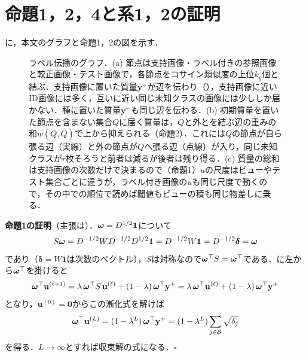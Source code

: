 \newcommand\TFaces{命題A1}
\newcommand\TLimits{定理A1}
\newcommand\TValid{定理A2}
\newcommand\TEscape{定理A3}
\newcommand\TCapture{定理A4}
\newcommand\CSep{系A1}
\section{命題1，2，4と系1，2の証明}
\label{sec:app_proofs}
に，本文のグラフと命題1，2の図を示す．

\begin{figure}[htbp]
\centering
\scalebox{0.77}{}
\caption{ラベル伝播のグラフ．(a) 節点は支持画像・ラベル付きの参照画像と較正画像・テスト画像で，各節点をコサイン類似度の上位$k_g$個と結ぶ．支持画像に置いた質量$\mathbf{y}^{+}$が辺を伝わり（），支持画像に近いID画像には多く，互いに近い同じ未知クラスの画像には少ししか届かない．種に置いた質量$\mathbf{y}^{-}$も同じ辺を伝わる．(b) 初期質量を置いた節点を含まない集合$Q$に届く質量は，$Q$と外とを結ぶ辺の重みの和$w(Q,\bar{Q})$で上から抑えられる（命題2）．これには$Q$の節点が自ら張る辺（実線）と外の節点が$Q$へ張る辺（点線）が入り，同じ未知クラスが$r$枚そろうと前者は減るが後者は残り得る．(c) 質量の総和は支持画像の次数だけで決まるので（命題1）$u$の尺度はビューやテスト集合ごとに違うが，ラベル付き画像の$u$も同じ尺度で動くので，その中での順位で読めば閾値もビューの積も同じ物差しに乗る．}
\label{fig:graph}
\end{figure}

\textbf{命題1の証明}（主張は）．$\boldsymbol{\omega}=D^{1/2}\mathbf{1}$について
\begin{equation*}
S\boldsymbol{\omega}=D^{-1/2}WD^{-1/2}D^{1/2}\mathbf{1}=D^{-1/2}W\mathbf{1}=D^{-1/2}\boldsymbol{\delta}=\boldsymbol{\omega}
\end{equation*}
であり（$\boldsymbol{\delta}=W\mathbf{1}$は次数のベクトル），$S$は対称なので$\boldsymbol{\omega}^{\top}S=\boldsymbol{\omega}^{\top}$である．に左から$\boldsymbol{\omega}^{\top}$を掛けると
\begin{equation*}
\boldsymbol{\omega}^{\top}\mathbf{u}^{(\ell+1)}
=\lambda\,\boldsymbol{\omega}^{\top}S\,\mathbf{u}^{(\ell)}+(1-\lambda)\,\boldsymbol{\omega}^{\top}\mathbf{y}^{+}
=\lambda\,\boldsymbol{\omega}^{\top}\mathbf{u}^{(\ell)}+(1-\lambda)\,\boldsymbol{\omega}^{\top}\mathbf{y}^{+}
\end{equation*}
となり，$\mathbf{u}^{(0)}=\mathbf{0}$からこの漸化式を解けば
\begin{equation*}
\boldsymbol{\omega}^{\top}\mathbf{u}^{(L)}=(1-\lambda^{L})\,\boldsymbol{\omega}^{\top}\mathbf{y}^{+}=(1-\lambda^{L})\sum_{j\in\mathcal{S}}\sqrt{\delta_j}
\end{equation*}
を得る．$L\to\infty$とすれば収束解の式になる．$\square$

